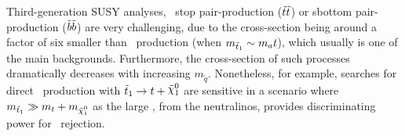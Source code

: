 				Third-generation SUSY analyses, \eg\ stop pair-production ($\tilde{t}\tilde{t}$) or sbottom pair-production ($\tilde{b}\tilde{b}$) are very challenging, due to the cross-section being around a factor of six smaller than \ttbar\ production (when $m_{\tilde{t}_1} \sim m_at$), which usually is one of the main backgrounds. Furthermore, the cross-section of such processes dramatically decreases with increasing $m_{\tilde{q}}$. Nonetheless, for example, searches for direct \stopone\ production with $\stopone \ra t + \ninoone$ are sensitive in a scenario where $m_{\stopone} \gg m_t + m_{\ninoone}$ as the large \met, from the neutralinos, provides discriminating power for \ttbar\ rejection.
				